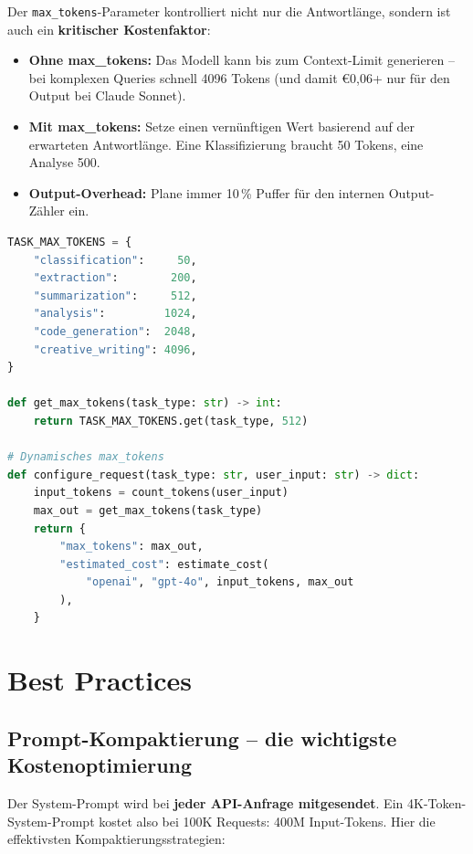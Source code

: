 Der \texttt{max\_tokens}-Parameter kontrolliert nicht nur die Antwortlänge, sondern ist auch ein \textbf{kritischer Kostenfaktor}:

\begin{itemize}[leftmargin=*]
    \item \textbf{Ohne max\_tokens:} Das Modell kann bis zum Context-Limit generieren -- bei komplexen Queries schnell 4096 Tokens (und damit €0,06+ nur für den Output bei Claude Sonnet).
    \item \textbf{Mit max\_tokens:} Setze einen vernünftigen Wert basierend auf der erwarteten Antwortlänge. Eine Klassifizierung braucht 50 Tokens, eine Analyse 500.
    \item \textbf{Output-Overhead:} Plane immer 10\,\% Puffer für den internen Output-Zähler ein.
\end{itemize}

\begin{lstlisting}[language=Python, caption={max\_tokens sinnvoll setzen}]
TASK_MAX_TOKENS = {
    "classification":     50,
    "extraction":        200,
    "summarization":     512,
    "analysis":         1024,
    "code_generation":  2048,
    "creative_writing": 4096,
}

def get_max_tokens(task_type: str) -> int:
    return TASK_MAX_TOKENS.get(task_type, 512)

# Dynamisches max_tokens
def configure_request(task_type: str, user_input: str) -> dict:
    input_tokens = count_tokens(user_input)
    max_out = get_max_tokens(task_type)
    return {
        "max_tokens": max_out,
        "estimated_cost": estimate_cost(
            "openai", "gpt-4o", input_tokens, max_out
        ),
    }
\end{lstlisting}

\section{Best Practices}

\subsection{Prompt-Kompaktierung -- die wichtigste Kostenoptimierung}

Der System-Prompt wird bei \textbf{jeder API-Anfrage mitgesendet}. Ein 4K-Token-System-Prompt kostet also bei 100K Requests: 400M Input-Tokens. Hier die effektivsten Kompaktierungsstrategien:

